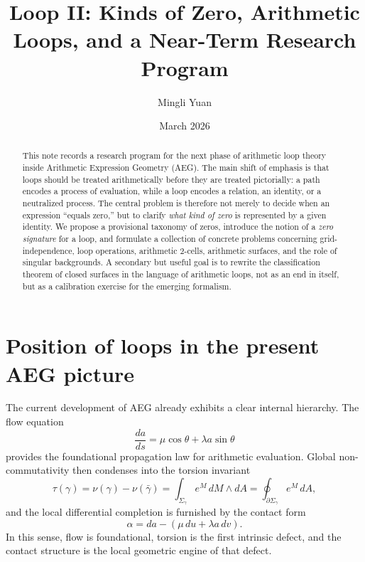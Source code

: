 \documentclass[11pt]{article}
\title{\textbf{Loop II: Kinds of Zero, Arithmetic Loops, and a Near-Term Research Program}}
\author{Mingli Yuan}
\date{March 2026}
\newcommand{\AEG}{AEG}
\begin{document}
\maketitle

\begin{abstract}
This note records a research program for the next phase of arithmetic loop theory inside Arithmetic Expression Geometry (\AEG). The main shift of emphasis is that loops should be treated arithmetically before they are treated pictorially: a path encodes a process of evaluation, while a loop encodes a relation, an identity, or a neutralized process. The central problem is therefore not merely to decide when an expression ``equals zero,'' but to clarify \emph{what kind of zero} is represented by a given identity. We propose a provisional taxonomy of zeros, introduce the notion of a \emph{zero signature} for a loop, and formulate a collection of concrete problems concerning grid-independence, loop operations, arithmetic 2-cells, arithmetic surfaces, and the role of singular backgrounds. A secondary but useful goal is to rewrite the classification theorem of closed surfaces in the language of arithmetic loops, not as an end in itself, but as a calibration exercise for the emerging formalism.
\end{abstract}

\section{Position of loops in the present \AEG{} picture}

The current development of \AEG{} already exhibits a clear internal hierarchy. The flow equation
\begin{equation}
\frac{da}{ds} = \mu \cos \theta + \lambda a \sin \theta
\end{equation}
provides the foundational propagation law for arithmetic evaluation. Global non-commutativity then condenses into the torsion invariant
\begin{equation}
\tau(\gamma) = \nu(\gamma) - \nu(\bar\gamma)
= \int_{\Sigma_\gamma} e^M\, dM \wedge dA
= \oint_{\partial \Sigma_\gamma} e^M\, dA,
\end{equation}
and the local differential completion is furnished by the contact form
\begin{equation}
\alpha = da - (\mu\,du + \lambda a\,dv).
\end{equation}
In this sense, flow is foundational, torsion is the first intrinsic defect, and the contact structure is the local geometric engine of that defect.
\end{document}
